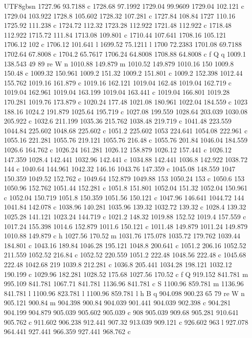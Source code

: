 \documentclass[11pt,a4paper,oneside]{report}
\begin{document}
\begin{CJK*}{UTF8}{gbsn}
{1727.96 93.7188 c 1728.68 97.1992 1729.04 99.9609 1729.04 102.121 c 1729.04 103.922 1728.8 105.602
1728.32 107.281 c 1727.84 108.84 1727 110.16 1725.92 111.238 c 1724.72 112.32 1723.28 112.922 1721.48
112.922 c 1718.48 112.922 1715.72 111.84 1713.08 109.801 c 1710.44 107.641 1708.16 105.121 1706.12 102 c
1706.12 101.641 l 1699.52 75.1211 l 1700 72.2383 1701.08 69.7188 1702.64 67.8008 c 1704.2 65.7617 1706.24
64.8008 1708.88 64.8008 c f Q q 1009.1 138.543 49 89 re W n 1010.88 149.879 m 1010.52 149.879 1010.16 150
1009.8 150.48 c 1009.32 150.961 1009.2 151.32 1009.2 151.801 c 1009.2 152.398 1012.44 155.762 1019.16
161.879 c 1019.16 162.121 1019.04 162.48 1019.04 162.719 c 1019.04 162.961 1019.04 163.199 1019.04
163.441 c 1019.04 166.801 1019.28 170.281 1019.76 173.879 c 1020.24 177.48 1021.08 180.961 1022.04
184.559 c 1023 188.16 1024.2 191.879 1025.64 195.719 c 1027.08 199.559 1028.64 203.039 1030.08 205.922 c
1032.6 211.199 1035.36 215.762 1038.48 219.719 c 1041.48 223.559 1044.84 225.602 1048.68 225.602 c 1051.2
225.602 1053 224.641 1054.08 222.961 c 1055.16 221.281 1055.76 219.121 1055.76 216.48 c 1055.76 201.84
1046.04 184.559 1026.6 164.762 c 1026.24 161.281 1026.12 158.879 1026.12 157.441 c 1026.12 147.359 1028.4
142.441 1032.96 142.441 c 1034.88 142.441 1036.8 142.922 1038.72 144 c 1040.64 144.961 1042.32 146.16
1043.76 147.359 c 1045.08 148.559 1047 150.359 1049.52 152.762 c 1049.64 152.879 1049.88 153 1050.24 153
c 1050.6 153 1050.96 152.762 1051.44 152.281 c 1051.8 151.801 1052.04 151.32 1052.04 150.961 c 1052.04
150.719 1051.8 150.359 1051.56 150.121 c 1047.96 146.641 1044.72 144 1041.84 142.078 c 1038.96 140.281
1035.96 139.32 1032.72 139.32 c 1028.4 139.32 1025.28 141.121 1023.24 144.719 c 1021.2 148.32 1019.88
152.52 1019.4 157.559 c 1017.24 155.398 1014.6 152.879 1011.6 150.121 c 1011.48 149.879 1011.24 149.879
1010.88 149.879 c h 1027.56 170.52 m 1031.76 175.078 1035.72 179.762 1039.44 184.801 c 1043.16 189.84
1046.28 195.121 1048.8 200.641 c 1051.2 206.16 1052.52 211.559 1052.52 216.84 c 1052.52 220.559 1051.2
222.48 1048.56 222.48 c 1045.68 222.48 1042.68 219 1039.8 212.281 c 1036.8 205.441 1034.28 198.121
1032.12 190.199 c 1029.96 182.281 1028.52 175.68 1027.56 170.52 c f Q 919.152 841.781 m 995.109 841.781
1067.71 841.781 1136.96 841.781 c S 1100.96 859.781 m 1136.96 841.781 l 1100.96 823.781 l 1100.96 859.781
l h B q 904.098 900.23 65 79 re W n 905.121 900.84 m 904.398 900.84 904.039 901.441 904.039 902.398 c
904.281 904.199 904.879 905.039 905.602 905.039 c 908 905.039 909.68 905.281 910.641 905.762 c 911.602
906.238 912.441 907.32 913.039 909.121 c 926.602 963 l 927.078 964.441 927.441 966.359 927.441 968.762 c
}
\end{CJK*}
\end{document}
